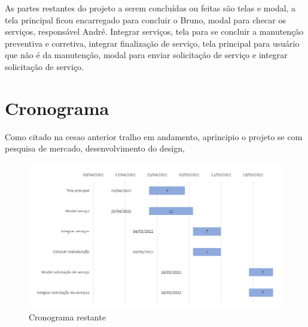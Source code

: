 \documentclass[%
  a4paper,%
  12pt,%
  english,%
  brazilian,%
]{article}
\begin{document}
As partes restantes do projeto a serem concluídas ou feitas são telas e modal, a tela principal ficou encarregado para concluir o Bruno, modal para checar os serviços, responsável André. Integrar serviços, tela para se concluir a manutenção preventiva e corretiva, integrar finalização de serviço, tela principal para usuário que não é da manutenção, modal para enviar solicitação de serviço e integrar solicitação de serviço.




\section{Cronograma}%

Como citado na cesao anterior tralho em andamento, aprincipio o projeto se com pesquisa de mercado, desenvolvimento do design,  

\begin{figure}[!h]
  \includegraphics[width = 0.95\linewidth]{Figures/graf.png}
  \caption{Cronograma restante}
  \end{figure}
\end{document}
